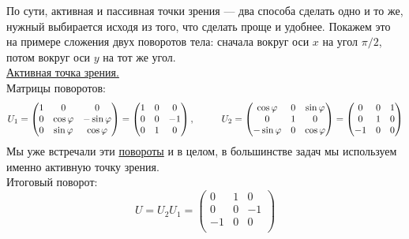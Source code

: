 \begin{example}
    По сути, активная и пассивная точки зрения --- два способа сделать одно и то же, нужный выбирается исходя из того, что сделать проще и удобнее. Покажем это на примере сложения двух поворотов тела: сначала вокруг оси $x$ на угол $\pi / 2$, потом вокруг оси $y$ на тот же угол.\\

    \underline{Активная точка зрения.}\\
    Матрицы поворотов:
    \[
    U_1 = \begin{pmatrix}
        1 & 0 & 0\\
        0 & \cos{\ensuremath{\varphi}} & -\sin{\ensuremath{\varphi}}\\
        0 & \sin{\ensuremath{\varphi}} & \cos{\ensuremath{\varphi}}\\
    \end{pmatrix} = \begin{pmatrix}
        1 & 0 & 0\\
        0 & 0 & -1\\
        0 & 1 & 0\\
    \end{pmatrix}, \hspace*{1cm} U_2 = \begin{pmatrix}
    \cos{\ensuremath{\varphi}} & 0 & \sin{\ensuremath{\varphi}}\\
    0 & 1 & 0\\
    -\sin{\ensuremath{\varphi}} & 0 & \cos{\ensuremath{\varphi}}\\
\end{pmatrix} = \begin{pmatrix}
    0 & 0 & 1\\
    0 & 1 & 0\\
    -1 & 0 & 0\\
\end{pmatrix}
    \]
    Мы уже встречали эти \hyperlink{turns}{повороты} и в целом, в большинстве задач мы используем именно активную точку зрения.\\
    Итоговый поворот:
    \[
    U = U_2U_1 = \begin{pmatrix}
        0 & 1 & 0\\
        0 & 0 & -1\\
        -1 & 0 & 0\\
    \end{pmatrix}
    \]
    

\end{example}
